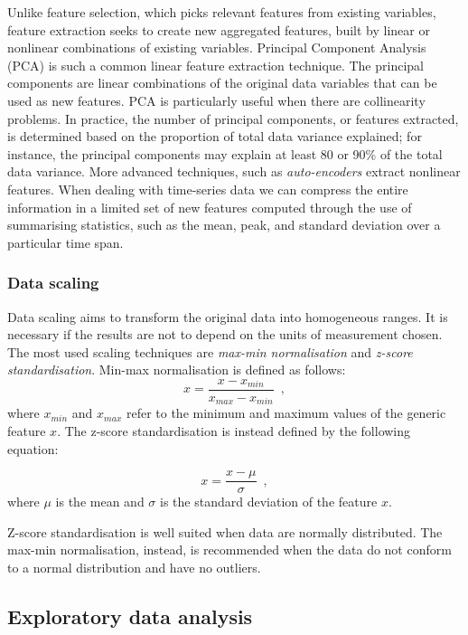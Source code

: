 Unlike feature selection, which picks relevant features from existing variables, feature extraction seeks to create new aggregated features, built by linear or nonlinear combinations of existing variables. Principal Component Analysis (PCA) is such a common linear feature extraction technique. The principal components are linear combinations of the original data variables that can be used as new features. PCA is particularly useful when there are collinearity problems. In practice, the number of principal components, or features extracted, is determined based on the proportion of total data variance explained; for instance, the principal components may explain at least 80 or 90\% of the total data variance. More advanced techniques, such as \textit{auto-encoders} \citep{rumelhart1985learning}  extract nonlinear features. When dealing with time-series data we can compress the entire information in a limited set of new features computed through the use of summarising statistics, such as the mean, peak, and standard deviation over a particular time span.

\subsubsection{Data scaling} \label{Data Scaling}

Data scaling aims to transform the original data into homogeneous ranges. It is necessary if the results are not to depend on the units of measurement chosen. The most used scaling techniques are \textit{max-min normalisation} and \textit{z-score standardisation}. Min-max normalisation is defined as follows: 
\begin{equation*}
    x = \frac{x - x_{min}}{x_{max} - x_{min}}
    \enspace,
\end{equation*}
%
where $x_{min}$ and $x_{max}$ refer to the minimum and maximum values of the generic feature $x$. The z-score standardisation is instead defined by the following equation:

\begin{equation*}
    x = \frac{x - \mu}{\sigma}
    \enspace,
\end{equation*}
%
where $\mu$ is the mean and $\sigma$ is the standard deviation of the feature $x$.

Z-score standardisation is well suited when data are normally distributed.
The max-min normalisation, instead, is recommended when the data do not conform to a normal distribution and have no outliers. 

\subsection{Exploratory data analysis} \label{Exploratory Data Analysis}

